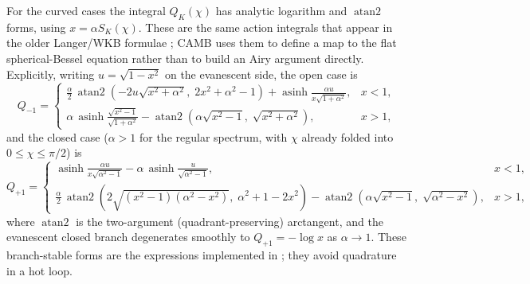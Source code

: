 \documentclass[11pt,a4paper]{article}
\newcommand{\code}[1]{\texttt{\detokenize{#1}}}
\newcommand{\SK}{S_K}
\newcommand{\asinh}{\operatorname{asinh}}
\newcommand{\atanTwo}{\operatorname{atan2}}
\begin{document}
For the curved cases the integral \(Q_K(\chi)\)
has analytic logarithm and \(\atanTwo\) forms, using
\(x=\alpha\SK(\chi)\).  These are the same action integrals that appear in the
older Langer/WKB formulae \cite{kosowsky1998,tram2013}; CAMB uses them to define
a map to the flat spherical-Bessel equation rather than to build an Airy
argument directly.  Explicitly, writing \(u=\sqrt{1-x^2}\) on the evanescent
side, the open case is
\begin{equation}
  Q_{-1}=
  \begin{cases}
  \displaystyle
  \frac{\alpha}{2}\,\atanTwo\!\left(-2u\sqrt{x^2+\alpha^2},\;2x^2+\alpha^2-1\right)
  +\asinh\frac{\alpha u}{x\sqrt{1+\alpha^2}}, & x<1,\\[1.5ex]
  \displaystyle
  \alpha\,\asinh\frac{\sqrt{x^2-1}}{\sqrt{1+\alpha^2}}
  -\atanTwo\!\left(\alpha\sqrt{x^2-1},\;\sqrt{x^2+\alpha^2}\right), & x>1,
  \end{cases}
  \label{eq:qexact-open}
\end{equation}
and the closed case (\(\alpha>1\) for the regular spectrum, with \(\chi\)
already folded into \(0\le\chi\le\pi/2\)) is
\begin{equation}
  Q_{+1}=
  \begin{cases}
  \displaystyle
  \asinh\frac{\alpha u}{x\sqrt{\alpha^2-1}}
  -\alpha\,\asinh\frac{u}{\sqrt{\alpha^2-1}}, & x<1,\\[1.5ex]
  \displaystyle
  \frac{\alpha}{2}\,\atanTwo\!\left(2\sqrt{(x^2-1)(\alpha^2-x^2)},\;\alpha^2+1-2x^2\right)
  -\atanTwo\!\left(\alpha\sqrt{x^2-1},\;\sqrt{\alpha^2-x^2}\right), & x>1,
  \end{cases}
  \label{eq:qexact-closed}
\end{equation}
where \(\atanTwo\) is the two-argument (quadrant-preserving) arctangent, and the
evanescent closed branch degenerates smoothly to \(Q_{+1}=-\log x\) as
\(\alpha\to1\).  These branch-stable forms are the expressions implemented in
\code{qintegral_exact}; they avoid quadrature in a hot loop.
\end{document}
